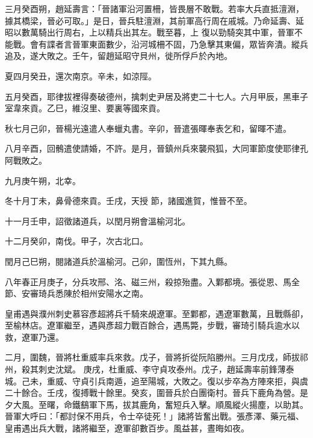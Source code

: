 \begin{pinyinscope}
 三月癸酉朔，趙延壽言：「晉諸軍沿河置柵，皆畏層不敢戰。若率大兵直抵澶淵，據其橋梁，晉必可取。」是日，晉兵駐澶淵，其前軍高行周在戚城。乃命延壽、延昭以數萬騎出行周右，上以精兵出其左。戰至暮，上
 復以勁騎突其中軍，晉軍不能戰。會有諜者言晉軍東面數少，沿河城柵不固，乃急擊其東偏，眾皆奔潰。縱兵追及，遂大敗之。壬午，留趙延昭守貝州，徙所俘戶於內地。



 夏四月癸丑，還次南京。辛未，如涼陘。



 五月癸酉，耶律拔裡得奏破德州，擒刺史尹居及將吏二十七人。六月甲辰，黑車子室韋來貢。乙巳，維沒里、要裏等國來貢。



 秋七月己卯，晉楊光遠遣人奉蠟丸書。辛卯，晉遣張暉奉表乞和，留暉不遣。



 八月辛酉，回鶻遣使請婚，不許。是月，晉鎮州兵來襲飛狐，大同軍節度使耶律孔阿戰敗之。



 九月庚午朔，北幸。



 冬十月丁未，鼻骨德來貢。壬戌，天授
 節，諸國進賀，惟晉不至。



 十一月壬申，詔徵諸道兵，以閏月朔會溫榆河北。



 十二月癸卯，南伐。甲子，次古北口。



 閏月己巳朔，閱諸道兵於溫榆河。己卯，圍恆州，下其九縣。



 八年春正月庚子，分兵攻邢、洺、磁三州，殺掠殆盡。入鄴都境。張從恩、馬全節、安審琦兵悉陳於相州安陽水之南。



 皇甫遇與濮州刺史慕容彥超將兵千騎來覘遼軍。至鄴都，遇遼軍數萬，且戰縣卻，至榆林店。遼軍繼至，遇與彥超力戰百餘合，遇馬斃，步戰，審琦引騎兵逾水以救，遼軍乃還。



 二月，圍魏，晉將杜重威率兵來救。戊子，晉將折從阮陷勝州。三月戊戌，師拔祁州，殺其刺史沈斌。
 庚戌，杜重威、李守貞攻泰州。戊子，趙延壽率前鋒薄泰城。己未，重威、守貞引兵南遁，追至陽城，大敗之。復以步卒為方陣來拒，與虞二十餘合。壬戌，復搏戰十餘里。癸亥，圍晉兵於白團衛村。晉兵下鹿角為營。是夕大風。至曙，命鐵鷂軍下馬，拔其鹿角，奮短兵入擊。順風縱火揚塵，以助其。晉軍大呼曰：「都討保不用兵，令士卒徒死！」諸將皆奮出戰。張彥澤、藥元福、皇甫遇出兵大戰，諸將繼至，遼軍卻數百步。風益甚，晝晦如夜。




\end{pinyinscope}
